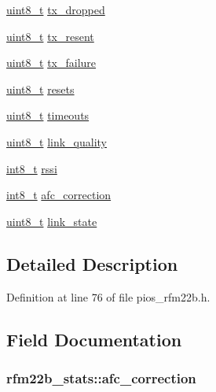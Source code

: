 \begin{DoxyCompactItemize}
\item 
\hyperlink{stdint_8h_aba7bc1797add20fe3efdf37ced1182c5}{uint8\-\_\-t} \hyperlink{structrfm22b__stats_a40ecedccb96317654da5118ca167bfe4}{tx\-\_\-dropped}
\item 
\hyperlink{stdint_8h_aba7bc1797add20fe3efdf37ced1182c5}{uint8\-\_\-t} \hyperlink{structrfm22b__stats_aad4359c902f65048dd74b5b5a4d9482d}{tx\-\_\-resent}
\item 
\hyperlink{stdint_8h_aba7bc1797add20fe3efdf37ced1182c5}{uint8\-\_\-t} \hyperlink{structrfm22b__stats_ae443df4225a025395b7fa6caea562a74}{tx\-\_\-failure}
\item 
\hyperlink{stdint_8h_aba7bc1797add20fe3efdf37ced1182c5}{uint8\-\_\-t} \hyperlink{structrfm22b__stats_a8d5014c62b137509e9a5a51fe9e1acae}{resets}
\item 
\hyperlink{stdint_8h_aba7bc1797add20fe3efdf37ced1182c5}{uint8\-\_\-t} \hyperlink{structrfm22b__stats_ae710ec372ffa9365a23fcd2d8f9f8e0e}{timeouts}
\item 
\hyperlink{stdint_8h_aba7bc1797add20fe3efdf37ced1182c5}{uint8\-\_\-t} \hyperlink{structrfm22b__stats_a8d32fed579e3be2fbc354ab176670af2}{link\-\_\-quality}
\item 
\hyperlink{stdint_8h_ad566f6541e98b74246db1a3a3a85ad49}{int8\-\_\-t} \hyperlink{structrfm22b__stats_af292c65ed2be928fd2c5e4639c2cf025}{rssi}
\item 
\hyperlink{stdint_8h_ad566f6541e98b74246db1a3a3a85ad49}{int8\-\_\-t} \hyperlink{structrfm22b__stats_a5e40de4c13a984c6342307cb88d33675}{afc\-\_\-correction}
\item 
\hyperlink{stdint_8h_aba7bc1797add20fe3efdf37ced1182c5}{uint8\-\_\-t} \hyperlink{structrfm22b__stats_aff1fd3341c07dab52a2a666cb6d7ddd4}{link\-\_\-state}
\end{DoxyCompactItemize}


\subsection{Detailed Description}


Definition at line 76 of file pios\-\_\-rfm22b.\-h.



\subsection{Field Documentation}
\hypertarget{structrfm22b__stats_a5e40de4c13a984c6342307cb88d33675}{
\subsubsection[{afc\-\_\-correction}]{ rfm22b\-\_\-stats\-::afc\-\_\-correction}}\label{structrfm22b__stats_a5e40de4c13a984c6342307cb88d33675}


